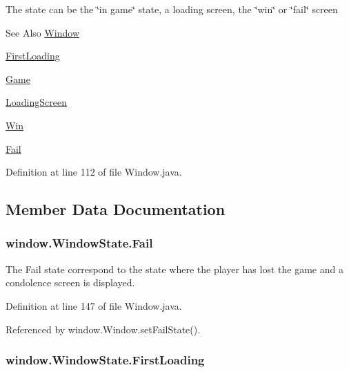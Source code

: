 The state can be the \char`\"{}in game\char`\"{} state, a loading screen, the \char`\"{}win\char`\"{} or \char`\"{}fail\char`\"{} screen \begin{DoxySeeAlso}{See Also}
\hyperlink{classwindow_1_1_window}{Window} 

\hyperlink{enumwindow_1_1_window_state_a56269b4774b71a1dcba9e5e9cefb495e}{First\-Loading} 

\hyperlink{enumwindow_1_1_window_state_abb4a2512f88d7104f91993174488282d}{Game} 

\hyperlink{enumwindow_1_1_window_state_a281f52964a4be64ea19bf2a401184521}{Loading\-Screen} 

\hyperlink{enumwindow_1_1_window_state_adfd70a04c81f1ff3b289d5b766206fb5}{Win} 

\hyperlink{enumwindow_1_1_window_state_ace96026e75eb5118b66e8703fd93d68c}{Fail} 
\end{DoxySeeAlso}


Definition at line 112 of file Window.\-java.



\subsection{Member Data Documentation}
\hypertarget{enumwindow_1_1_window_state_ace96026e75eb5118b66e8703fd93d68c}{
\subsubsection[{Fail}]{\setlength{\rightskip}{0pt plus 5cm}window.\-Window\-State.\-Fail}}\label{enumwindow_1_1_window_state_ace96026e75eb5118b66e8703fd93d68c}


The Fail state correspond to the state where the player has lost the game and a condolence screen is displayed. 



Definition at line 147 of file Window.\-java.



Referenced by window.\-Window.\-set\-Fail\-State().

\hypertarget{enumwindow_1_1_window_state_a56269b4774b71a1dcba9e5e9cefb495e}{
\subsubsection[{First\-Loading}]{\setlength{\rightskip}{0pt plus 5cm}window.\-Window\-State.\-First\-Loading}}\label{enumwindow_1_1_window_state_a56269b4774b71a1dcba9e5e9cefb495e}


